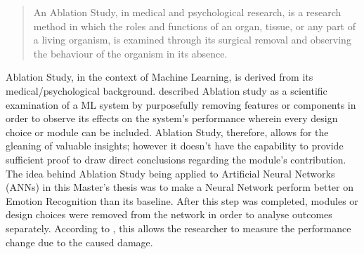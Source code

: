 \begin{quote}
    An Ablation Study, in medical and psychological research, is a research method in which the roles and functions of an organ, tissue, or any part of a living organism, is examined through its surgical removal and observing the behaviour of the organism in its absence.\citep[~p. 15]{Sheikholeslami:2019:AblationProgrammingML}
\end{quote}


Ablation Study, in the context of Machine Learning, is derived from its medical/psychological background. \citet{Sheikholeslami:2019:AblationProgrammingML} described Ablation study as a scientific examination of a \gls{ML} system by purposefully removing features or components in order to observe its effects on the system's performance wherein every design choice or module can be included. Ablation Study, therefore, allows for the gleaning of valuable insights; however it doesn't have the capability to provide sufficient proof to draw direct conclusions regarding the module's contribution.
\newline\newline
The idea behind Ablation Study being applied to Artificial Neural Networks (ANNs) in this Master's thesis was to make a Neural Network perform better on Emotion Recognition than its baseline. After this step was completed, modules or design choices were removed from the network in order to analyse outcomes separately. According to \citet{Fadelli:2018:AblationInANN}, this allows the researcher to measure the performance change due to the caused damage.


